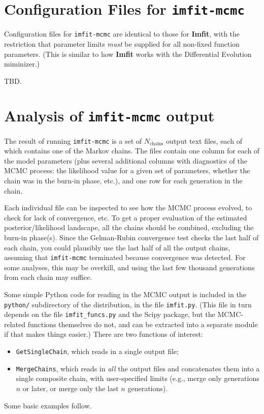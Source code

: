 \documentclass[10pt,a4paper,article]{memoir}
\newcommand{\imfit}{\textbf{Imfit}}
\newcommand{\imfitmcmc}{\texttt{imfit-mcmc}}
\begin{document}
\section{Configuration Files for \imfitmcmc{}}

Configuration files for \imfitmcmc{} are identical to those for \imfit{}, with
the restriction that parameter limits \textit{must} be supplied for all non-fixed
function parameters. (This is similar to how \imfit{} works with the Differential
Evolution miminizer.)

TBD.



\section{Analysis of \imfitmcmc{} output}

The result of running \imfitmcmc{} is a set of $N_{\textrm{chains}}$
output text files, each of which contains one of the Markov chains. The
files contain one column for each of the model parameters (plus several
additional columns with diagnostics of the MCMC process: the likelihood
value for a given set of parameters, whether the chain was in the
burn-in phase, etc.), and one row for each generation in the chain.

Each individual file can be inspected to see how the MCMC process
evolved, to check for lack of convergence, etc. To get a proper
evaluation of the estimated posterior/likelihood landscape, all the
chains should be combined, excluding the burn-in phase(s). Since the
Gelman-Rubin convergence test checks the last half of each chain, you
could plausibly use the last half of all the output chains, assuming
that \imfitmcmc{} terminated because convergence was detected. For some
analyses, this may be overkill, and using the last few thousand
generations from each chain may suffice.

Some simple Python code for reading in the MCMC output is included in
the \texttt{python/} subdirectory of the distribution, in the file
\texttt{imfit.py}. (This file in turn depends on the file
\texttt{imfit\_funcs.py} and the Scipy package, but the MCMC-related
functions themselves do not, and can be extracted into a separate module
if that makes things easier.) There are two functions of interest: 
\begin{itemize}
\item \texttt{GetSingleChain}, which reads in a single output file; 
\item \texttt{MergeChains}, which reads in \textit{all} the output files and 
concatenates them into a single composite chain, with user-specified limits 
(e.g., merge only generations $n$ or later, or merge only the last $n$ generations).
\end{itemize}
Some basic examples follow.
\end{document}

